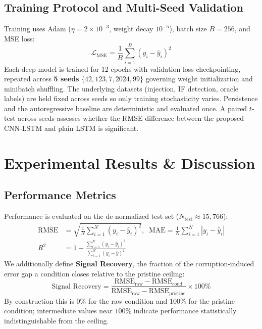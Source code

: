 \documentclass[conference]{IEEEtran}
\begin{document}
\subsection{Training Protocol and Multi-Seed Validation}
Training uses Adam ($\eta = 2\times 10^{-3}$, weight decay $10^{-5}$), batch size $B=256$, and MSE loss:
\begin{equation}
\mathcal{L}_{\text{MSE}} = \frac{1}{B}\sum_{i=1}^{B}\left(y_i - \hat{y}_i\right)^2
\end{equation}
Each deep model is trained for 12 epochs with validation-loss checkpointing, repeated across \textbf{5 seeds} $\{42, 123, 7, 2024, 99\}$ governing weight initialization and minibatch shuffling. The underlying datasets (injection, IF detection, oracle labels) are held fixed across seeds so only training stochasticity varies. Persistence and the autoregressive baseline are deterministic and evaluated once. A paired $t$-test across seeds assesses whether the RMSE difference between the proposed CNN-LSTM and plain LSTM is significant.

\section{Experimental Results \& Discussion}

\subsection{Performance Metrics}
Performance is evaluated on the de-normalized test set ($N_{\text{test}} \approx 15{,}766$):
\begin{align}
\text{RMSE} &= \sqrt{\frac{1}{N}\sum_{i=1}^N (y_i - \hat{y}_i)^2}, \;\;
\text{MAE} = \frac{1}{N}\sum_{i=1}^N |y_i - \hat{y}_i| \\
R^2 &= 1 - \frac{\sum_{i=1}^N (y_i - \hat{y}_i)^2}{\sum_{i=1}^N (y_i - \bar{y})^2}
\end{align}
We additionally define \textbf{Signal Recovery}, the fraction of the corruption-induced error gap a condition closes relative to the pristine ceiling:
\begin{equation}
\text{Signal Recovery} = \frac{\text{RMSE}_{\text{raw}} - \text{RMSE}_{\text{cond}}}{\text{RMSE}_{\text{raw}} - \text{RMSE}_{\text{pristine}}} \times 100\%
\end{equation}
By construction this is $0\%$ for the raw condition and $100\%$ for the pristine condition; intermediate values near $100\%$ indicate performance statistically indistinguishable from the ceiling.
\end{document}
